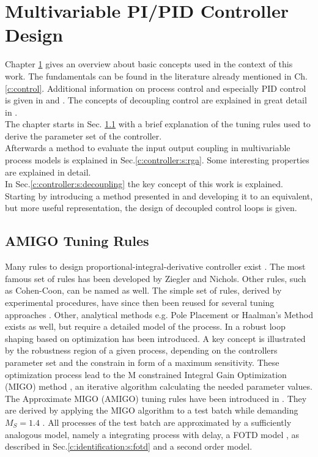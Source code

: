 \chapter{Multivariable PI/PID Controller Design}%
\label{c:controller}

Chapter \ref{c:controller} gives an overview about basic concepts used in the context of this work. The fundamentals can be found in the literature already mentioned in Ch.\ref{c:control}. Additional information on process control and especially PID control is given in \cite{Astrom1995} and \cite{Astrom2006}. The concepts of decoupling control are explained in great detail in \cite{Wang2006}.\\

The chapter starts in Sec. \ref{c:controller:s:AMIGO} with a brief explanation of the tuning rules used to derive the parameter set of the controller. \\

Afterwards a method to evaluate the input output coupling in multivariable process models is explained in Sec.\ref{c:controller:s:rga}. Some interesting properties are explained in detail.\\

In Sec.\ref{c:controller:s:decoupling} the key concept of this work is explained. Starting by introducing a method presented in \cite{Astrom2001a} and developing it to an equivalent, but more useful representation, the design of decoupled control loops is given. \\

\section{AMIGO Tuning Rules} %
\label{c:controller:s:AMIGO}

Many rules to design proportional-integral-derivative controller exist \cite[p.158 ff.]{Astrom2006}. The most famous set of rules has been developed by Ziegler and Nichols. Other rules, such as Cohen-Coon, can be named as well. The simple set of rules, derived by experimental procedures, have since then been reused for several tuning approaches \cite[p.169]{Astrom2006}. Other, analytical methods e.g. Pole Placement or Haalman's Method exists as well, but require a detailed model of the process.  In \cite[p.206 ff.]{Astrom2006} a robust loop shaping based on optimization has been introduced. A key concept is illustrated by the robustness region of a given process, depending on the controllers parameter set and the constrain in form of a maximum sensitivity. These optimization process lead to the M constrained Integral Gain Optimization (MIGO) method \cite[p.217]{Astrom2006}, an iterative algorithm calculating the needed parameter values.
The Approximate MIGO (AMIGO) tuning rules have been introduced in \cite[p.225 ff.]{Astrom2006}. They are derived by applying the MIGO algorithm to a test batch while demanding $M_S = 1.4$ . All processes of the test batch are approximated by a sufficiently analogous model, namely a integrating process with delay, a FOTD model , as described in Sec.\ref{c:identification:s:fotd} and a second order model. \\

